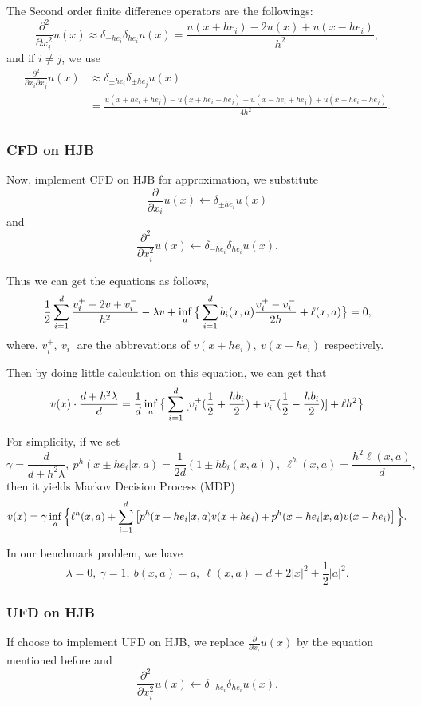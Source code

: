 \documentclass[12pt]{article}
\begin{document}
The Second order finite difference operators are the followings:
$$\frac{\partial^2}{\partial x_i^2} u(x) \approx \delta_{-he_i}\delta_{he_i} u(x) = \frac{u(x+he_i) - 2u(x) + u(x-he_i)}{h^2}, $$
and if $i \neq j$, we use
$$
\begin{aligned}
    \frac{\partial^2}{\partial x_i \partial x_j} u(x) &\approx \delta_{\pm he_i}\delta_{\pm he_j} u(x) \\ 
     &= \frac{u(x+he_i+he_j) - u(x+he_i-he_j) - u(x-he_i+he_j) + u(x-he_i-he_j)}{4h^2}. \\
\end{aligned}
$$

\subsubsection{CFD on HJB}

Now, implement CFD on HJB for approximation, we substitute 
$$\frac{\partial}{\partial x_i} u(x) \leftarrow \delta_{\pm he_i}u(x)$$
and 
$$\frac{\partial^2}{\partial x_i^2} u(x) \leftarrow \delta_{-he_i}\delta_{he_i}u(x). $$

Thus we can get the equations as follows,
$$\frac{1}{2}\sum_{i=1}^d{\frac{v_i^+ -2v + v_i^-}{h^2}} - \lambda v + \inf_{a} \big{\{} \sum_{i=1}^d b_i(x,a) \frac{v_i^+ - v_i^-}{2h} + \ell(x,a) \big{\}} = 0, $$
where, $v_i^+,\ v_i^-$ are the abbrevations of $v(x+he_i),\ v(x-he_i)$ respectively.

Then by doing little calculation on this equation, we can get that 
$$ v(x) \cdot \frac{d + h^2 \lambda}{d} = \frac{1}{d} \inf_{a} \big{\{} \sum_{i=1}^d { [v_i^+ (\frac{1}{2} + \frac{h b_i}{2}) + v_i^- (\frac{1}{2} - \frac{h b_i}{2})] } + \ell h^2 \big{\}} $$

For simplicity, if we set
$$\gamma = \frac{d}{d+h^2 \lambda},\ p^h(x \pm he_i|x,a) = \frac{1}{2d}(1 \pm h b_i(x,a)),\ \ell ^ h (x,a) = \frac{h^2 \ell (x,a)}{d}, $$
then it yields Markov Decision Process (MDP)
$$v(x) = \gamma \inf_{a} \Big{\{}\ell^h (x,a) + \sum_{i=1}^d \left[ p^h(x + he_i|x,a) v(x+he_i) + p^h(x - he_i|x,a) v(x-he_i) \right] \Big{\}}. $$

In our benchmark problem, we have 
$$\lambda = 0,\ \gamma = 1,\ b(x,a) = a,\ \ell (x,a) = d + 2 |x|^{2} + \frac{1}{2} |a|^{2}.$$

\subsubsection{UFD on HJB}

If choose to implement UFD on HJB, we replace $\frac{\partial}{\partial x_i} u(x)$ by the equation mentioned before and
$$\frac{\partial^2}{\partial x_i^2} u(x) \leftarrow \delta_{-he_i}\delta_{he_i}u(x). $$
\end{document}
